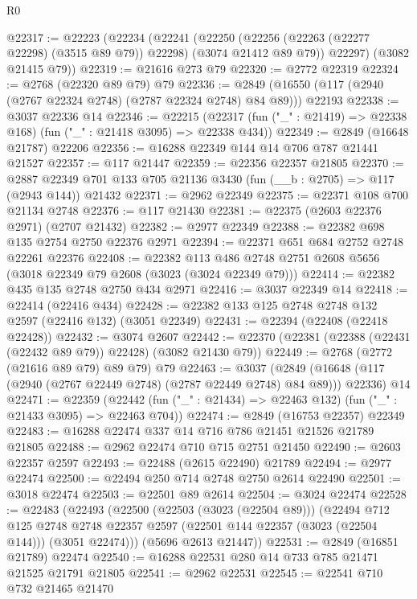 \begin{lexlean}{R0}
\begin{coremodule}
@22317 := @22223
    (@22234
      (@22241
        (@22250 (@22256 (@22263 (@22277 @22298) (@3515 @89 @79)) @22298) (@3074 @21412 @89 @79))
        @22297)
      (@3082 @21415 @79))
@22319 := @21616 @273 @79
@22320 := @2772 @22319
@22324 := @2768 (@22320 @89 @79) @79
@22336 := @2849 (@16550 (@117 (@2940 (@2767 @22324 @2748) (@2787 @22324 @2748) @84 @89))) @22193
@22338 := @3037 @22336 @14
@22346 := @22215
    (@22317 (fun ("_" : @21419) => @22338 @168) (fun ("_" : @21418 @3095) => @22338 @434))
@22349 := @2849 (@16648 @21787) @22206
@22356 := @16288 @22349 @144 @14 @706 @787 @21441 @21527
@22357 := @117 @21447
@22359 := @22356 @22357 @21805
@22370 := @2887 @22349 @701 @133 @705 @21136 @3430 (fun (__b : @2705) => @117 (@2943 @144)) @21432
@22371 := @2962 @22349
@22375 := @22371 @108 @700 @21134 @2748
@22376 := @117 @21430
@22381 := @22375 (@2603 @22376 @2971) (@2707 @21432)
@22382 := @2977 @22349
@22388 := @22382 @698 @135 @2754 @2750 @22376 @2971
@22394 := @22371 @651 @684 @2752 @2748 @22261 @22376
@22408 := @22382
    @113
    @486
    @2748
    @2751
    @2608
    @5656
    (@3018 @22349 @79 @2608 (@3023 (@3024 @22349 @79)))
@22414 := @22382 @435 @135 @2748 @2750 @434 @2971
@22416 := @3037 @22349 @14
@22418 := @22414 (@22416 @434)
@22428 := @22382 @133 @125 @2748 @2748 @132 @2597 (@22416 @132) (@3051 @22349)
@22431 := @22394 (@22408 (@22418 @22428))
@22432 := @3074 @2607
@22442 := @22370 (@22381 (@22388 (@22431 (@22432 @89 @79)) @22428) (@3082 @21430 @79))
@22449 := @2768 (@2772 (@21616 @89 @79) @89 @79) @79
@22463 := @3037
    (@2849 (@16648 (@117 (@2940 (@2767 @22449 @2748) (@2787 @22449 @2748) @84 @89))) @22336)
    @14
@22471 := @22359
    (@22442 (fun ("_" : @21434) => @22463 @132) (fun ("_" : @21433 @3095) => @22463 @704))
@22474 := @2849 (@16753 @22357) @22349
@22483 := @16288 @22474 @337 @14 @716 @786 @21451 @21526 @21789 @21805
@22488 := @2962 @22474 @710 @715 @2751 @21450
@22490 := @2603 @22357 @2597
@22493 := @22488 (@2615 @22490) @21789
@22494 := @2977 @22474
@22500 := @22494 @250 @714 @2748 @2750 @2614 @22490
@22501 := @3018 @22474
@22503 := @22501 @89 @2614
@22504 := @3024 @22474
@22528 := @22483
    (@22493
      (@22500
        (@22503 (@3023 (@22504 @89)))
        (@22494
          @712
          @125
          @2748
          @2748
          @22357
          @2597
          (@22501 @144 @22357 (@3023 (@22504 @144)))
          (@3051 @22474)))
      (@5696 @2613 @21447))
@22531 := @2849 (@16851 @21789) @22474
@22540 := @16288 @22531 @280 @14 @733 @785 @21471 @21525 @21791 @21805
@22541 := @2962 @22531
@22545 := @22541 @710 @732 @21465 @21470

\end{coremodule}
\end{lexlean}
